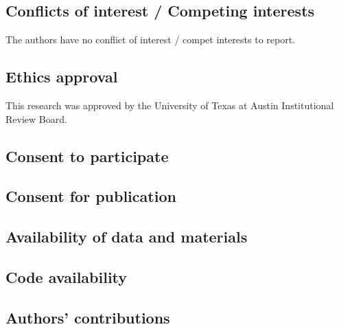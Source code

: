 \documentclass[doc, floatsintext]{apa7}
\begin{document}
\subsection{Conflicts of interest / Competing interests}
The authors have no conflict of interest / compet interests
to report.

\subsection{Ethics approval}
This research was approved by the University of Texas at
Austin Institutional Review Board.

\subsection{Consent to participate}

\subsection{Consent for publication}

\subsection{Availability of data and materials}

\subsection{Code availability}

\subsection{Authors' contributions}

\printbibliography
\end{document}
